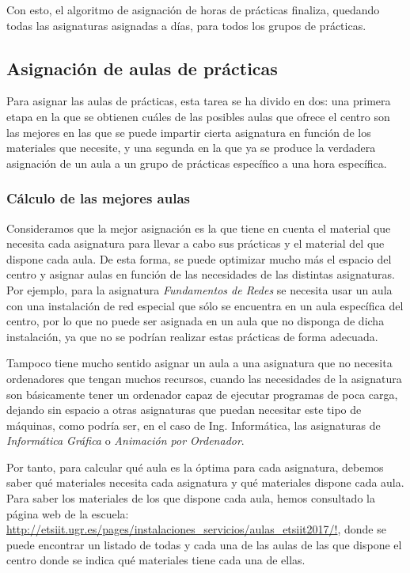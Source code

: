 Con esto, el algoritmo de asignación de horas de prácticas finaliza, quedando todas las asignaturas asignadas a días, para todos los grupos de prácticas.

\subsection{Asignación de aulas de prácticas}

Para asignar las aulas de prácticas, esta tarea se ha divido en dos: una primera etapa en la que se obtienen cuáles de las posibles aulas que ofrece el centro son las mejores en las que se puede impartir cierta asignatura en función de los materiales que necesite, y una segunda en la que ya se produce la verdadera asignación de un aula a un grupo de prácticas específico a una hora específica.

\subsubsection{Cálculo de las mejores aulas}

Consideramos que la mejor asignación es la que tiene en cuenta el material que necesita cada asignatura para llevar a cabo sus prácticas y el material del que dispone cada aula. De esta forma, se puede optimizar mucho más el espacio del centro y asignar aulas en función de las necesidades de las distintas asignaturas. Por ejemplo, para la asignatura \textit{Fundamentos de Redes} se necesita usar un aula con una instalación de red especial que sólo se encuentra en un aula específica del centro, por lo que no puede ser asignada en un aula que no disponga de dicha instalación, ya que no se podrían realizar estas prácticas de forma adecuada.

Tampoco tiene mucho sentido asignar un aula a una asignatura que no necesita ordenadores que tengan muchos recursos, cuando las necesidades de la asignatura son básicamente tener un ordenador capaz de ejecutar programas de poca carga, dejando sin espacio a otras asignaturas que puedan necesitar este tipo de máquinas, como podría ser, en el caso de Ing. Informática, las asignaturas de \textit{Informática Gráfica} o \textit{Animación por Ordenador}.

Por tanto, para calcular qué aula es la óptima para cada asignatura, debemos saber qué materiales necesita cada asignatura y qué materiales dispone cada aula. Para saber los materiales de los que dispone cada aula, hemos consultado la página web de la escuela: \url{http://etsiit.ugr.es/pages/instalaciones_servicios/aulas_etsiit2017/!}, donde se puede encontrar un listado de todas y cada una de las aulas de las que dispone el centro donde se indica qué materiales tiene cada una de ellas. 

